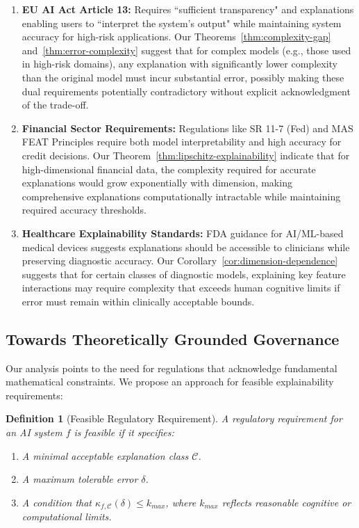 \documentclass[11pt,letter,leqno]{article}
\newtheorem{definition}[theorem]{Definition}
\begin{document}
\begin{enumerate}
\item \textbf{EU AI Act Article 13:} Requires ``sufficient transparency" and explanations enabling users to ``interpret the system's output" while maintaining system accuracy for high-risk applications.  Our Theorems~\ref{thm:complexity-gap} and~\ref{thm:error-complexity} suggest that for complex models (e.g., those used in high-risk domains), any explanation with significantly lower complexity than the original model must incur substantial error, possibly making these dual requirements potentially contradictory without explicit acknowledgment of the trade-off.

\item \textbf{Financial Sector Requirements:} Regulations like SR 11-7 (Fed) and MAS FEAT Principles require both model interpretability and high accuracy for credit decisions.  Our Theorem~\ref{thm:lipschitz-explainability} indicate that for high-dimensional financial data, the complexity required for accurate explanations would grow exponentially with dimension, making comprehensive explanations computationally intractable while maintaining required accuracy thresholds.

\item \textbf{Healthcare Explainability Standards:} FDA guidance for AI/ML-based medical devices suggests explanations should be accessible to clinicians while preserving diagnostic accuracy.  Our Corollary~\ref{cor:dimension-dependence} suggests that for certain classes of diagnostic models, explaining key feature interactions may require complexity that exceeds human cognitive limits if error must remain within clinically acceptable bounds.
\end{enumerate}

\subsection{Towards Theoretically Grounded Governance}
\label{subsec:governance}

Our analysis points to the need for regulations that acknowledge fundamental mathematical constraints.  We propose an approach for feasible explainability requirements:

\begin{definition}[Feasible Regulatory Requirement]
\label{def:feasible-requirement}
A regulatory requirement for an AI system $f$ is feasible if it specifies:
\begin{enumerate}
\item A minimal acceptable explanation class $\mathcal{C}$.
\item A maximum tolerable error $\delta$.
\item A condition that $\kappa_{f,\mathcal{C}}(\delta) \leq k_{max}$, where $k_{max}$ reflects reasonable cognitive or computational limits.
\end{enumerate}
\end{definition}
\end{document}
